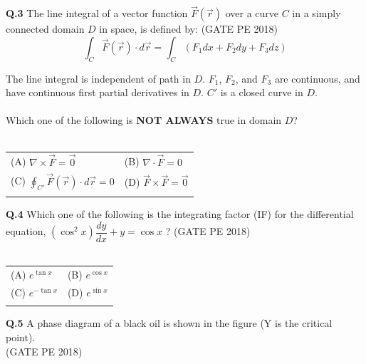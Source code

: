\documentclass[12pt,a4paper]{article}
\begin{document}
\noindent
\textbf{Q.3} \hspace{0.5em} The line integral of a vector function $\vec{F}(\vec{r})$ over a curve $C$ in a simply connected domain $D$ in space, is defined by: \hfill{(GATE PE 2018)} \\

\[
\int_C \vec{F}(\vec{r}) \cdot d\vec{r} = \int_C (F_1 dx + F_2 dy + F_3 dz)
\]

The line integral is independent of path in $D$. $F_1$, $F_2$, and $F_3$ are continuous, and have continuous first partial derivatives in $D$. $C'$ is a closed curve in $D$.\\\\

\noindent
Which one of the following is \textbf{NOT ALWAYS} true in domain $D$?\\\\

\begin{tabular}{ll}
(A) $\nabla \times \vec{F} = \vec{0}$ \hspace{2em} & (B) $\nabla \cdot \vec{F} = 0$ \hspace{2em}\\
(C) $\oint_{C'} \vec{F}(\vec{r}) \cdot d\vec{r} = 0$ \hspace{2em} & (D) $\vec{F} \times \vec{F} = \vec{0}$\\\\
\end{tabular}

\noindent
\textbf{Q.4} \hspace{0.5em} Which one of the following is the integrating factor (IF) for the differential equation, $(\cos^2 x)\dfrac{dy}{dx} + y = \cos x$ ? \hfill(GATE PE 2018)\\\\


\begin{tabular}{ll}
(A) $e^{\tan x}$ \hspace{2em} & (B) $e^{\cos x}$ \hspace{2em}\\
(C) $e^{-\tan x}$ \hspace{2em} & (D) $e^{\sin x}$\\\\
\end{tabular}

\pagebreak

\noindent
\textbf{Q.5}\hspace{0.5em} A phase diagram of a black oil is shown in the figure (Y is the critical point).\\\hfill(GATE PE 2018)\\\\
\end{document}
